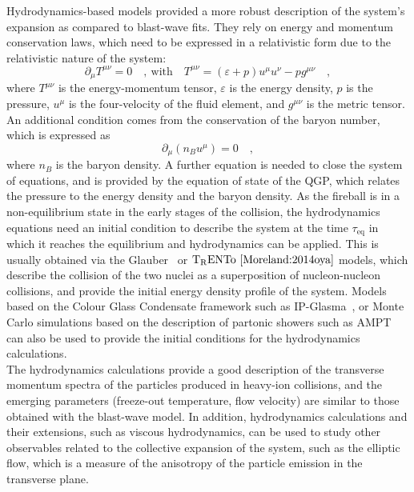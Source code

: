 Hydrodynamics-based models provided a more robust description of the system's expansion as compared to blast-wave fits. They rely on energy and momentum conservation laws, which need to be expressed in a relativistic form due to the relativistic nature of the system:
\begin{equation*}
    \partial_\mu T^{\mu\nu} = 0\quad ,~\mathrm{with}\quad T^{\mu\nu} = (\varepsilon + p)u^\mu u^\nu - p g^{\mu\nu}\quad ,
\end{equation*}
where $T^{\mu\nu}$ is the energy-momentum tensor, $\varepsilon$ is the energy density, $p$ is the pressure, $u^\mu$ is the four-velocity of the fluid element, and $g^{\mu\nu}$ is the metric tensor. An additional condition comes from the conservation of the baryon number, which is expressed as
\begin{equation*}
    \partial_\mu (n_B u^\mu) = 0\quad ,
\end{equation*}
where $n_B$ is the baryon density. A further equation is needed to close the system of equations, and is provided by the equation of state of the QGP, which relates the pressure to the energy density and the baryon density. As the fireball is in a non-equilibrium state in the early stages of the collision, the hydrodynamics equations need an initial condition to describe the system at the time $\tau_\mathrm{eq}$ in which it reaches the equilibrium and hydrodynamics can be applied. This is usually obtained via the Glauber~\cite{Miller:2007ri} or $\mathrm{T_RENTo}~\cite{Moreland:2014oya}$ models, which describe the collision of the two nuclei as a superposition of nucleon-nucleon collisions, and provide the initial energy density profile of the system. Models based on the Colour Glass Condensate framework such as IP-Glasma~\cite{Lappi:2006fp}, or Monte Carlo simulations based on the description of partonic showers such as AMPT~\cite{Lin:2004en} can also be used to provide the initial conditions for the hydrodynamics calculations. \\
The hydrodynamics calculations provide a good description of the transverse momentum spectra of the particles produced in heavy-ion collisions, and the emerging parameters (freeze-out temperature, flow velocity) are similar to those obtained with the blast-wave model. In addition, hydrodynamics calculations and their extensions, such as viscous hydrodynamics, can be used to study other observables related to the collective expansion of the system, such as the elliptic flow, which is a measure of the anisotropy of the particle emission in the transverse plane.

